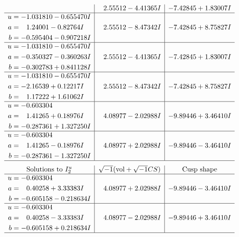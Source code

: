 \documentclass[1p]{elsarticle_modified}
\theoremstyle{definition}
\newcommand{\I}{\sqrt{-1}}
\begin{document}
$$\begin{array}{c|c|c}
 & \phantom{-}2.55512 - 4.41365 I & -7.42845 + 1.83007 I \\ \hline\begin{aligned}
u &= -1.031810 - 0.655470 I \\
a &= \phantom{-}1.24001 - 0.82764 I \\
b &= -0.595404 - 0.907218 I\end{aligned}
 & \phantom{-}2.55512 - 8.47342 I & -7.42845 + 8.75827 I \\ \hline\begin{aligned}
u &= -1.031810 - 0.655470 I \\
a &= -0.350327 - 0.360263 I \\
b &= -0.302783 + 0.841128 I\end{aligned}
 & \phantom{-}2.55512 - 4.41365 I & -7.42845 + 1.83007 I \\ \hline\begin{aligned}
u &= -1.031810 - 0.655470 I \\
a &= -2.16539 + 0.12217 I \\
b &= \phantom{-}1.17222 + 1.61062 I\end{aligned}
 & \phantom{-}2.55512 - 8.47342 I & -7.42845 + 8.75827 I \\ \hline\begin{aligned}
u &= -0.603304\phantom{ +0.000000I} \\
a &= \phantom{-}1.41265 + 0.18976 I \\
b &= -0.287361 + 1.327250 I\end{aligned}
 & \phantom{-}4.08977 - 2.02988 I & -9.89446 + 3.46410 I \\ \hline\begin{aligned}
u &= -0.603304\phantom{ +0.000000I} \\
a &= \phantom{-}1.41265 - 0.18976 I \\
b &= -0.287361 - 1.327250 I\end{aligned}
 & \phantom{-}4.08977 + 2.02988 I & -9.89446 - 3.46410 I\\
 \hline 
 \end{array}$$\newpage$$\begin{array}{c|c|c}  
\text{Solutions to }I^u_{2}& \I (\text{vol} + \sqrt{-1}CS) & \text{Cusp shape}\\
 \hline 
\begin{aligned}
u &= -0.603304\phantom{ +0.000000I} \\
a &= \phantom{-}0.40258 + 3.33383 I \\
b &= -0.605158 - 0.218634 I\end{aligned}
 & \phantom{-}4.08977 + 2.02988 I & -9.89446 - 3.46410 I \\ \hline\begin{aligned}
u &= -0.603304\phantom{ +0.000000I} \\
a &= \phantom{-}0.40258 - 3.33383 I \\
b &= -0.605158 + 0.218634 I\end{aligned}
 & \phantom{-}4.08977 - 2.02988 I & -9.89446 + 3.46410 I\\
 \hline 
 \end{array}$$\newpage\newpage\renewcommand{\arraystretch}{1}
\end{document}

